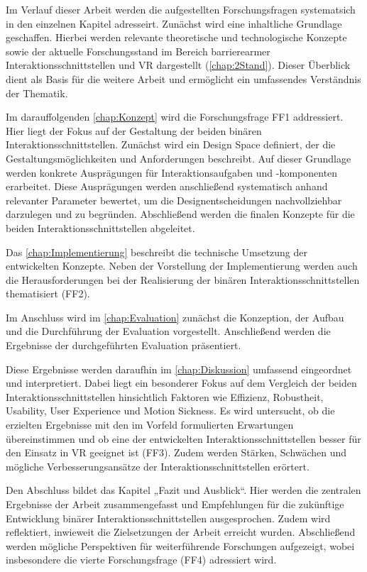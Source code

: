 Im Verlauf dieser Arbeit werden die aufgestellten Forschungsfragen systematsich in den einzelnen Kapitel adresseirt. Zunächst wird eine inhaltliche Grundlage geschaffen. Hierbei werden relevante theoretische und technologische Konzepte sowie der aktuelle Forschungsstand im Bereich barrierearmer Interaktionsschnittstellen und VR dargestellt (\autoref{chap:2Stand}). Dieser Überblick dient als Basis für die weitere Arbeit und ermöglicht ein umfassendes Verständnis der Thematik.

Im darauffolgenden \autoref{chap:Konzept} wird die Forschungsfrage FF1 addressiert. Hier liegt der Fokus auf der Gestaltung der beiden binären Interaktionsschnittstellen. Zunächst wird ein Design Space definiert, der die Gestaltungsmöglichkeiten und Anforderungen beschreibt. Auf dieser Grundlage werden konkrete Ausprägungen für Interaktionsaufgaben und -komponenten erarbeitet. Diese Ausprägungen werden anschließend systematisch anhand relevanter Parameter bewertet, um die Designentscheidungen nachvollziehbar darzulegen und zu begründen. Abschließend werden die finalen Konzepte für die beiden Interaktionsschnittstellen abgeleitet.

Das \autoref{chap:Implementierung} beschreibt die technische Umsetzung der entwickelten Konzepte. Neben der Vorstellung der Implementierung werden auch die Herausforderungen bei der Realisierung der binären Interaktionsschnittstellen thematisiert (FF2).

Im Anschluss wird im \autoref{chap:Evaluation} zunächst die Konzeption, der Aufbau und die Durchführung der Evaluation vorgestellt. Anschließend werden die Ergebnisse der durchgeführten Evaluation präsentiert.

Diese Ergebnisse werden daraufhin im \autoref{chap:Diskussion} umfassend eingeordnet und interpretiert. Dabei liegt ein besonderer Fokus auf dem Vergleich der beiden Interaktionsschnittstellen hinsichtlich Faktoren wie Effizienz, Robustheit, Usability, User Experience und Motion Sickness. Es wird untersucht, ob die erzielten Ergebnisse mit den im Vorfeld formulierten Erwartungen übereinstimmen und ob eine der entwickelten Interaktionsschnittstellen besser für den Einsatz in VR geeignet ist (FF3). Zudem werden Stärken, Schwächen und mögliche Verbesserungsansätze der Interaktionsschnittstellen erörtert.

Den Abschluss bildet das Kapitel „Fazit und Ausblick“. Hier werden die zentralen Ergebnisse der Arbeit zusammengefasst und Empfehlungen für die zukünftige Entwicklung binärer Interaktionsschnittstellen ausgesprochen. Zudem wird reflektiert, inwieweit die Zielsetzungen der Arbeit erreicht wurden. Abschließend werden mögliche Perspektiven für weiterführende Forschungen aufgezeigt, wobei insbesondere die vierte Forschungsfrage (FF4) adressiert wird.

